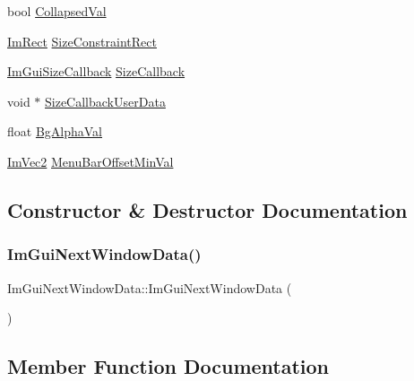 \begin{DoxyCompactItemize}
bool \mbox{\hyperlink{struct_im_gui_next_window_data_a0c4c81bf78a6ac094f794d2cf318037a}{Collapsed\+Val}}
\item 
\mbox{\hyperlink{struct_im_rect}{Im\+Rect}} \mbox{\hyperlink{struct_im_gui_next_window_data_a63e7f1aa93d6bf9eed7452d57d3930c9}{Size\+Constraint\+Rect}}
\item 
\mbox{\hyperlink{imgui_8h_a1cccf55557c2153a9d4af6db73dc3a91}{Im\+Gui\+Size\+Callback}} \mbox{\hyperlink{struct_im_gui_next_window_data_acab3905da227922b52f03943b355b27a}{Size\+Callback}}
\item 
void $\ast$ \mbox{\hyperlink{struct_im_gui_next_window_data_a3b80639b573e9a009da8aa9f9ca1a250}{Size\+Callback\+User\+Data}}
\item 
float \mbox{\hyperlink{struct_im_gui_next_window_data_a3597005fb1cdd4d3fa06296bbbb5a2c2}{Bg\+Alpha\+Val}}
\item 
\mbox{\hyperlink{struct_im_vec2}{Im\+Vec2}} \mbox{\hyperlink{struct_im_gui_next_window_data_ab2b226f215bfdf2639f620e6d84157f6}{Menu\+Bar\+Offset\+Min\+Val}}
\end{DoxyCompactItemize}


\subsection{Constructor \& Destructor Documentation}
\mbox{\label{struct_im_gui_next_window_data_a0471ae42c04fce2e38c9cd8c37690b09}} 
\subsubsection{\texorpdfstring{Im\+Gui\+Next\+Window\+Data()}{ImGuiNextWindowData()}}
{\footnotesize\ttfamily Im\+Gui\+Next\+Window\+Data\+::\+Im\+Gui\+Next\+Window\+Data (\begin{DoxyParamCaption}{ }\end{DoxyParamCaption})\hspace{0.3cm}{\ttfamily [inline]}}



\subsection{Member Function Documentation}
\mbox{\label{struct_im_gui_next_window_data_ae20d7287a7f96592363988f138e11bd5}} 
